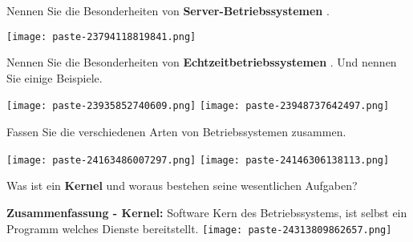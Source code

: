 \documentclass{article}
\begin{document}
\begin{tcolorbox}[colback=white!10!white,colframe=lightgray!75!black,
  savelowerto=\jobname_ex.tex,breakable,enhanced,lines before break=40]

\begin{center}
Nennen Sie die Besonderheiten von 
\textbf{Server-Betriebssystemen
}.

\end{center}

\tcblower

\justifying
\texttt{[image: paste-23794118819841.png]}

\end{tcolorbox}
\begin{tcolorbox}[colback=white!10!white,colframe=lightgray!75!black,
  savelowerto=\jobname_ex.tex,breakable,enhanced,lines before break=40]

\begin{center}
Nennen Sie die Besonderheiten von 
\textbf{Echtzeitbetriebssystemen
}. Und nennen Sie einige Beispiele.

\end{center}

\tcblower

\justifying
\texttt{[image: paste-23935852740609.png]}
\texttt{[image: paste-23948737642497.png]}

\end{tcolorbox}
\begin{tcolorbox}[colback=white!10!white,colframe=lightgray!75!black,
  savelowerto=\jobname_ex.tex,breakable,enhanced,lines before break=40]

\begin{center}
Fassen Sie die verschiedenen Arten von Betriebssystemen zusammen.

\end{center}

\tcblower

\justifying
\texttt{[image: paste-24163486007297.png]}
\texttt{[image: paste-24146306138113.png]}

\end{tcolorbox}
\begin{tcolorbox}[colback=white!10!white,colframe=lightgray!75!black,
  savelowerto=\jobname_ex.tex,breakable,enhanced,lines before break=40]

\begin{center}
Was ist ein 
\textbf{Kernel
}und woraus bestehen seine wesentlichen Aufgaben?

\end{center}

\tcblower

\justifying
\textbf{Zusammenfassung - Kernel:
}Software Kern des Betriebssystems, ist selbst ein Programm welches Dienste bereitstellt.
\texttt{[image: paste-24313809862657.png]}

\end{tcolorbox}
\end{document}

